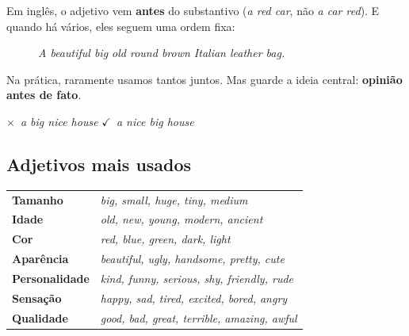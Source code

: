 \documentclass[12pt,a4paper,oneside]{book}
\newcommand{\en}[1]{\textit{#1}}                 %
\newcommand{\ok}{\textcolor{green!45!black}{$\checkmark$}}
\newcommand{\no}{\textcolor{red!70!black}{$\times$}}
\begin{document}
Em inglês, o adjetivo vem \textbf{antes} do substantivo (\en{a red car}, não \en{a car red}). E quando há vários, eles seguem uma ordem fixa:

\begin{figure}[H]
\centering
{}
\caption{\en{A beautiful big old round brown Italian leather bag.}}
\end{figure}

Na prática, raramente usamos tantos juntos. Mas guarde a ideia central: \textbf{opinião antes de fato}.

\no\ \en{a big nice house} \qquad \ok\ \en{a nice big house}

\subsection{Adjetivos mais usados}

\begin{center}
\begin{tabularx}{\textwidth}{@{}lX@{}}
\toprule
\textbf{Tamanho} & \en{big, small, huge, tiny, medium} \\
\textbf{Idade} & \en{old, new, young, modern, ancient} \\
\textbf{Cor} & \en{red, blue, green, dark, light} \\
\textbf{Aparência} & \en{beautiful, ugly, handsome, pretty, cute} \\
\textbf{Personalidade} & \en{kind, funny, serious, shy, friendly, rude} \\
\textbf{Sensação} & \en{happy, sad, tired, excited, bored, angry} \\
\textbf{Qualidade} & \en{good, bad, great, terrible, amazing, awful} \\
\bottomrule
\end{tabularx}
\end{center}
\end{document}
